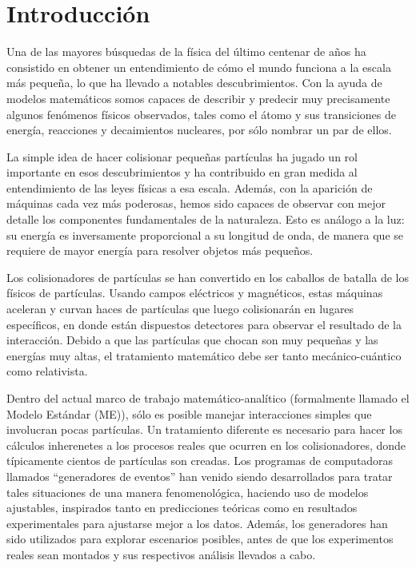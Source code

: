 \documentclass[a4paper,12pt]{article}
\begin{document}
\newpage

\tableofcontents

\newpage

\section{Introducción}
\label{sec:introduction}

Una de las mayores búsquedas de la física del último centenar de años ha consistido en obtener un entendimiento de cómo el mundo funciona a la escala más pequeña, lo que ha llevado a notables descubrimientos. Con la ayuda de modelos matemáticos somos capaces de describir y predecir muy precisamente algunos fenómenos físicos observados, tales como el átomo y sus transiciones de energía, reacciones y decaimientos nucleares, por sólo nombrar un par de ellos.

La simple idea de hacer colisionar pequeñas partículas ha jugado un rol importante en esos descubrimientos y ha contribuido en gran medida al entendimiento de las leyes físicas a esa escala. Además, con la aparición de máquinas cada vez más poderosas, hemos sido capaces de observar con mejor detalle los componentes fundamentales de la naturaleza. Esto es análogo a la luz: su energía es inversamente proporcional a su longitud de onda, de manera que se requiere de mayor energía para resolver objetos más pequeños.

Los colisionadores de partículas se han convertido en los caballos de batalla de los físicos de partículas. Usando campos eléctricos y magnéticos, estas máquinas aceleran y curvan haces de partículas que luego colisionarán en lugares específicos, en donde están dispuestos detectores para observar el resultado de la interacción. Debido a que las partículas que chocan son muy pequeñas y las energías muy altas, el tratamiento matemático debe ser tanto mecánico-cuántico como relativista.

Dentro del actual marco de trabajo matemático-analítico (formalmente llamado el Modelo Estándar (ME)), sólo es posible manejar interacciones simples que involucran pocas partículas. Un tratamiento diferente es necesario para hacer los cálculos inherenetes a los procesos reales que ocurren en los colisionadores, donde típicamente cientos de partículas son creadas. Los programas de computadoras llamados ``generadores de eventos'' han venido siendo desarrollados para tratar tales situaciones de una manera fenomenológica, haciendo uso de modelos ajustables, inspirados tanto en predicciones teóricas como en resultados experimentales para ajustarse mejor a los datos. Además, los generadores han sido utilizados para explorar escenarios posibles, antes de que los experimentos reales sean montados y sus respectivos análisis llevados a cabo.
\end{document}
